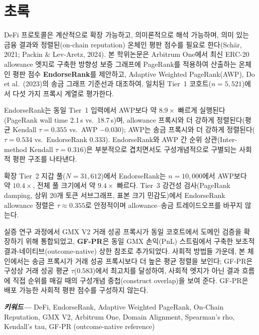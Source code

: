 
\chapter*{초록}

\label{ch:abstract}

DeFi 프로토콜은 계산적으로 확장 가능하고, 의미론적으로 해석 가능하며, 의미 있는 금융 결과와 정렬된(on-chain reputation) 온체인 평판 점수를 필요로 한다(Sch\"{a}r, 2021; Packin \& Lev-Aretz, 2024). 본 학위논문은 Arbitrum One에서 최신 ERC-20 allowance 엣지로 구축한 방향성 보증 그래프에 PageRank를 적용하여 산출하는 온체인 평판 점수 \textbf{EndorseRank}를 제안하고, Adaptive Weighted PageRank(AWP), Do et al.\ (2023)의 송금 그래프 기준선과 대조하여, 일치된 Tier~1 코호트($n=5{,}521$)에서 다섯 가지 프록시 계열로 평가한다.

EndorseRank는 동일 Tier~1 입력에서 AWP보다 약 $8.9\times$ 빠르게 실행된다(PageRank wall time 2.1\,s vs.\ 18.7\,s)며, allowance 프록시와 더 강하게 정렬된다(평균 Kendall $\tau=0.355$ vs.\ AWP $-0.030$); AWP는 송금 프록시와 더 강하게 정렬된다($\tau=0.534$ vs.\ EndorseRank $0.333$). EndorseRank와 AWP 간 순위 상관(Inter-method Kendall $\tau=0.316$)은 부분적으로 겹치면서도 구성개념적으로 구별되는 사회적 평판 구조를 나타낸다.

확장 Tier~2 지갑 풀($N=31{,}612$)에서 EndorseRank는 $n=10{,}000$에서 AWP보다 약 $10.4\times$, 전체 풀 크기에서 약 $9.4\times$ 빠르다. Tier~3 강건성 검사(PageRank damping, 상위 20개 토큰 서브그래프, 표본 크기 민감도)에서 EndorseRank allowance 정렬은 $\tau \approx 0.355$로 안정적이며 allowance--송금 트레이드오프를 바꾸지 않는다.

실증 연구 과정에서 GMX V2 거래 성공 프록시가 동일 코호트에서 도메인 검증을 확장하기 위해 통합되었고, \textbf{GF-PR}은 동일 GMX 손익(PnL) 스트림에서 구축한 보조적 결과-네이티브(outcome-native) 상한 참조로 추가되었다. 사회적 방법들 가운데, 본 체인에서는 송금 프록시가 거래 성공 프록시보다 더 높은 평균 정렬을 보인다; GF-PR은 구성상 거래 성공 평균 $\tau$($0.583$)에서 최고치를 달성하여, 사회적 엣지가 아닌 결과 흐름에 직접 순위를 매길 때의 구성개념 중첩(construct overlap)을 보여 준다. GF-PR은 배포 가능한 사회적 평판 점수를 구성하지 않는다.

\textbf{\emph{키워드---}} DeFi, EndorseRank, Adaptive Weighted PageRank, On-Chain Reputation, GMX V2, Arbitrum One, Domain Alignment, Spearman's rho, Kendall's tau, GF-PR (outcome-native reference)
